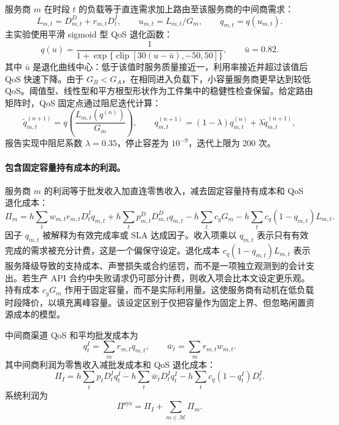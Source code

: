 \documentclass[UTF8,11pt,a4paper]{ctexart}
\newcommand{\qos}{q}
\newcommand{\M}{\mathcal{M}}
\newcommand{\D}{D}
\begin{document}
服务商 $m$ 在时段 $t$ 的负载等于直连需求加上路由至该服务商的中间商需求：
\begin{equation}
  L_{m,t}=\D^D_{m,t}+r_{m,t}\D^I_t,
  \qquad
  u_{m,t}=L_{m,t}/G_m,
  \qquad
  q_{m,t}=\qos(u_{m,t}).
  \label{eq:load}
\end{equation}
主实验使用平滑 sigmoid 型 QoS 退化函数：
\begin{equation}
  \qos(u)=
  \frac{1}{1+\exp\{\operatorname{clip}[30(u-\bar u),-50,50]\}},
  \qquad \bar u=0.82 .
  \label{eq:qos_function}
\end{equation}
其中 $\bar u$ 是退化曲线中心：低于该值时服务质量接近一，利用率接近并超过该值后 QoS 快速下降。由于 $G_B<G_A$，在相同进入负载下，小容量服务商更早达到较低 QoS。阈值型、线性型和平方根型形状作为工件集中的稳健性检查保留。给定路由矩阵时，QoS 固定点通过阻尼迭代计算：
\begin{equation}
  \tilde q^{(n+1)}_{m,t}
  =\qos\!\left(\frac{L_{m,t}(q^{(n)})}{G_m}\right),
  \qquad
  q^{(n+1)}_{m,t}
  =(1-\lambda)q^{(n)}_{m,t}+\lambda \tilde q^{(n+1)}_{m,t},
  \label{eq:qos_fixed_point}
\end{equation}
报告实现中阻尼系数 $\lambda=0.35$，停止容差为 $10^{-9}$，迭代上限为 200 次。

\paragraph{包含固定容量持有成本的利润。}

服务商 $m$ 的利润等于批发收入加直连零售收入，减去固定容量持有成本和 QoS 退化成本：
\begin{equation}
  \Pi_m=h\!\sum_t\! w_{m,t}r_{m,t}\D^I_t q_{m,t}
  +h\!\sum_t\! p^D_{m,t}\D^D_{m,t}q_{m,t}
  -h\!\sum_t\! c_g G_m
  -h\!\sum_t\! c_q(1-q_{m,t})L_{m,t}.
  \label{eq:firm_profit}
\end{equation}
因子 $q_{m,t}$ 被解释为有效完成率或 SLA 达成因子。收入项乘以 $q_{m,t}$ 表示只有有效完成的需求被充分计费，这是一个偏保守设定。退化成本 $c_q(1-q_{m,t})L_{m,t}$ 表示服务降级导致的支持成本、声誉损失或合约惩罚，而不是一项独立观测到的会计支出。若生产 API 合约中失败请求仍可部分计费，则收入项会比本文设定更乐观。持有成本 $c_gG_m$ 作用于固定容量，而不是实际利用量。这使服务商有动机在低负载时段降价，以填充离峰容量。该设定区别于仅把容量作为固定上界、但忽略闲置资源成本的模型。

中间商渠道 QoS 和平均批发成本为
\begin{equation}
  q^I_t=\sum_m r_{m,t}q_{m,t},
  \qquad
  \bar w_t=\sum_m r_{m,t}w_{m,t}.
  \label{eq:intermediary_channel}
\end{equation}
其中间商利润为零售收入减批发成本和 QoS 退化成本：
\begin{equation}
  \Pi_I
  =h\sum_t p_t\D^I_t q^I_t
  -h\sum_t \bar w_t\D^I_t q^I_t
  -h\sum_t c_q(1-q^I_t)\D^I_t .
  \label{eq:intermediary_profit}
\end{equation}
系统利润为
\begin{equation}
  \Pi^{\mathrm{sys}}=\Pi_I+\sum_{m\in\M}\Pi_m .
  \label{eq:system_profit}
\end{equation}
\end{document}
